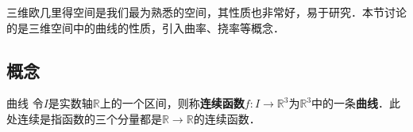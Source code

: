 
三维欧几里得空间是我们最为熟悉的空间，其性质也非常好，易于研究．本节讨论的是三维空间中的曲线的性质，引入曲率、挠率等概念．

\subsection{概念}

\begin{definition}{曲线}
令$I$是实数轴$\mathbb{R}$上的一个区间，则称\textbf{连续函数}$f:I\to \mathbb{R}^3$为$\mathbb{R}^3$中的一条\textbf{曲线}．此处连续是指函数的三个分量都是$\mathbb{R}\to\mathbb{R}$的连续函数．
\end{definition}






